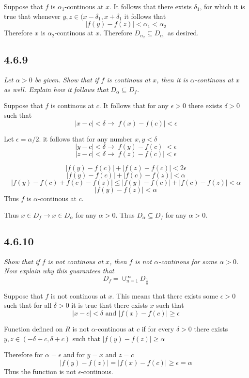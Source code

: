 \documentclass[11pt,oneside,titlepage]{book}
\begin{document}
Suppose that $f$ is $\alpha_1$-continous at $x$. It follows that there exists
$\delta_1$, for which it is true that whenever
$y, z \in (x - \delta_1, x + \delta_1$ it follows that 
$$|f(y) - f(z)| < \alpha_1 < \alpha_2$$
Therefore $x$ is $\alpha_2$-continous at $x$. Therefore
$D_{\alpha_2} \subseteq D_{\alpha_1}$
as desired.

\subsection*{4.6.9}
\textit{Let $\alpha > 0$ be given. Show that if $f$ is continous at $x$, then
  it is $\alpha$-continous at $x$ as well. Explain how it follows that
  $D_\alpha \subseteq D_f$.}

Suppose that $f$ is continous at $c$. It follows that for any $\epsilon > 0$
there exists $\delta > 0$ such that 
$$|x - c| < \delta \to |f(x) - f(c)| < \epsilon$$

Let $\epsilon = \alpha / 2$. it follows that for any number $x, y < \delta$
$$|y - c| < \delta \to |f(y) - f(c)| < \epsilon$$
$$|z - c| < \delta \to |f(z) - f(c)| < \epsilon$$


$$|f(y) - f(c)| + |f(z) - f(c)| < 2\epsilon$$
$$|f(y) - f(c)| + |f(c) - f(z)| < \alpha$$
$$|f(y) - f(c) + f(c) - f(z)| \leq |f(y) - f(c)| + |f(c) - f(z)| < \alpha$$
$$|f(y)  - f(z)|  < \alpha$$
Thus $f$ is $\alpha$-continous at $c$.

Thus $x \in D_f \to x \in D_\alpha$ for any $\alpha > 0$. Thus
$D_\alpha \subseteq D_f$ for any $\alpha > 0$.

\subsection*{4.6.10}
\textit{Show that if $f$ is not continous at $x$, then $f$ is not
  $\alpha$-continous for some $\alpha > 0$. Now explain why this guarantees
  that}
$$D_f = \cup_{n = 1}^{\infty}D_{\frac 1 n }$$

Suppose that $f$ is not continous at $x$. This means that there exists some
$\epsilon > 0$ such that for all $\delta > 0$ it is true that
there exists $x$ such that 
$$|x - c| < \delta \text{ and } |f(x) - f(c)| \geq \epsilon$$


Function defined on $R$ is not $\alpha$-continous at $c$
if for every $\delta > 0$ there exists
$y, z \in (-\delta + c, \delta + c)$ such that 
$|f(y) - f(z)| \geq \alpha$

Therefore for $\alpha = \epsilon$ and for $y = x$ and $z = c$
$$|f(y) - f(z)| = |f(x) - f(c)|  \geq \epsilon =  \alpha$$
Thus the function is not $\epsilon$-continous.
\end{document}
